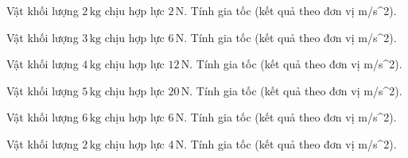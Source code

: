 \begin{ex}
Vật khối lượng $2\,\text{kg}$ chịu hợp lực $2\,\text{N}$. Tính gia tốc (kết quả theo đơn vị m/s^2).
\end{ex}

\begin{ex}
Vật khối lượng $3\,\text{kg}$ chịu hợp lực $6\,\text{N}$. Tính gia tốc (kết quả theo đơn vị m/s^2).
\end{ex}

\begin{bt}
Vật khối lượng $4\,\text{kg}$ chịu hợp lực $12\,\text{N}$. Tính gia tốc (kết quả theo đơn vị m/s^2).
\end{bt}

\begin{bt}
Vật khối lượng $5\,\text{kg}$ chịu hợp lực $20\,\text{N}$. Tính gia tốc (kết quả theo đơn vị m/s^2).
\end{bt}

\begin{bt}
Vật khối lượng $6\,\text{kg}$ chịu hợp lực $6\,\text{N}$. Tính gia tốc (kết quả theo đơn vị m/s^2).
\end{bt}

\begin{bt}
Vật khối lượng $2\,\text{kg}$ chịu hợp lực $4\,\text{N}$. Tính gia tốc (kết quả theo đơn vị m/s^2).
\end{bt}

